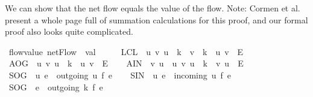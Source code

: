 \begin{isabellebody}
\begin{isamarkuptext}%
We can show that the net flow equals the value of the flow.
  Note: Cormen et al.~\cite{CLRS09} present a whole page full of 
  summation calculations for this proof, and our formal proof also 
  looks quite complicated.%
\end{isamarkuptext}\isamarkuptrue%
\isamarkupfalse%
\ flow{\isacharunderscore}value{\isacharcolon}\ {\isachardoublequoteopen}netFlow\ {\isacharequal}\ val{\isachardoublequoteclose}\isanewline
%
\isadelimproof
%
\endisadelimproof
%
\isatagproof
{}\isamarkupfalse%
\ {\isacharminus}\isanewline
\ \ \isamarkupfalse%
\ {\isacharquery}LCL\ {\isacharequal}\ {\isachardoublequoteopen}{\isacharbraceleft}{\isacharparenleft}u{\isacharcomma}\ v{\isacharparenright}{\isachardot}\ u\ {\isasymin}\ k\ {\isasymand}\ v\ {\isasymin}\ k\ {\isasymand}\ {\isacharparenleft}u{\isacharcomma}\ v{\isacharparenright}\ {\isasymin}\ E{\isacharbraceright}{\isachardoublequoteclose}\isanewline
\ \ \isamarkupfalse%
\ {\isacharquery}AOG\ {\isacharequal}\ {\isachardoublequoteopen}{\isacharbraceleft}{\isacharparenleft}u{\isacharcomma}\ v{\isacharparenright}{\isachardot}\ u\ {\isasymin}\ k\ {\isasymand}\ {\isacharparenleft}u{\isacharcomma}\ v{\isacharparenright}\ {\isasymin}\ E{\isacharbraceright}{\isachardoublequoteclose}\isanewline
\ \ \isamarkupfalse%
\ {\isacharquery}AIN\ {\isacharequal}\ {\isachardoublequoteopen}{\isacharbraceleft}{\isacharparenleft}v{\isacharcomma}\ u{\isacharparenright}\ {\isacharbar}\ u\ v{\isachardot}\ u\ {\isasymin}\ k\ {\isasymand}\ {\isacharparenleft}v{\isacharcomma}\ u{\isacharparenright}\ {\isasymin}\ E{\isacharbraceright}{\isachardoublequoteclose}\isanewline
\ \ \isamarkupfalse%
\ {\isacharquery}SOG\ {\isacharequal}\ {\isachardoublequoteopen}{\isasymlambda}u{\isachardot}\ {\isacharparenleft}{\isasymSum}e\ {\isasymin}\ outgoing\ u{\isachardot}\ f\ e{\isacharparenright}{\isachardoublequoteclose}\isanewline
\ \ \isamarkupfalse%
\ {\isacharquery}SIN\ {\isacharequal}\ {\isachardoublequoteopen}{\isasymlambda}u{\isachardot}\ {\isacharparenleft}{\isasymSum}e\ {\isasymin}\ incoming\ u{\isachardot}\ f\ e{\isacharparenright}{\isachardoublequoteclose}\isanewline
\ \ \isamarkupfalse%
\ {\isacharquery}SOG{\isacharprime}\ {\isacharequal}\ {\isachardoublequoteopen}{\isacharparenleft}{\isasymSum}e\ {\isasymin}\ outgoing{\isacharprime}\ k{\isachardot}\ f\ e{\isacharparenright}{\isachardoublequoteclose}\isanewline
\ \ \isamarkupfalse%

\end{isabellebody}
